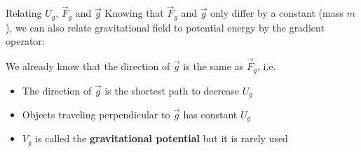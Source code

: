 \documentclass[12pt,compress,aspectratio=169]{beamer}
\begin{document}
\begin{frame}{Relating $U_g$, $\vec F_g$ and $\vec g$}
  Knowing that $\vec F_g$ and $\vec g$ only differ by a constant (mass $m$), we
  can also relate gravitational field to potential energy by the gradient
  operator:


  We already know that the direction of $\vec g$ is the same as $\vec F_g$,
  i.e.
  \begin{itemize}
  \item The direction of $\vec g$ is the shortest path to decrease $U_g$ 
  \item Objects traveling perpendicular to $\vec g$ has constant $U_g$
  \item $V_g$ is called the \textbf{gravitational potential} but
    it is rarely used
  \end{itemize}
\end{frame}
\end{document}
